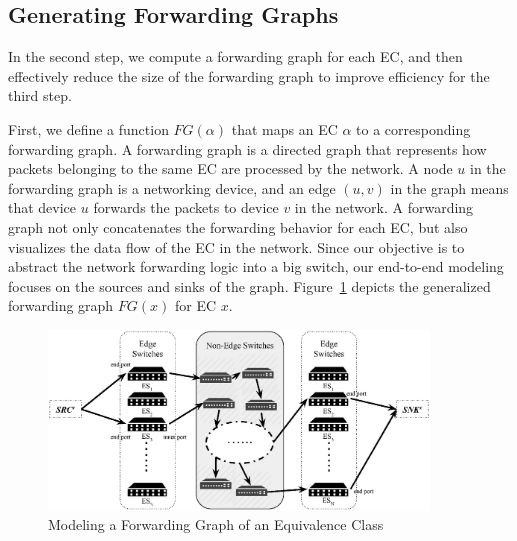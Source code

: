 \subsection{Generating Forwarding Graphs}
\label{OBS:Sec:GenerateFG}

In the second step, we compute a forwarding graph for each EC, and then effectively reduce the size of the forwarding graph to improve efficiency for the third step.

First, we define a function $FG(\alpha)$ that maps an EC $\alpha$ to a corresponding forwarding graph. A forwarding graph is a directed graph that represents how packets belonging to the same EC are processed by the network. A node $u$ in the forwarding graph is a networking device, and an edge $(u, v)$ in the graph means that device $u$ forwards the packets to device $v$ in the network.
A forwarding graph not only concatenates the forwarding behavior for each EC, but also visualizes the data flow of the EC in the network.
Since our objective is to abstract the network forwarding logic into a big switch, our end-to-end modeling focuses on the sources and sinks of the graph.
Figure~\ref{OBS:Fig:ForwardingGraphECX} depicts the generalized forwarding graph $FG(x)$ for EC $x$.


\begin{figure}
    \centering
    \includegraphics[width=0.9\textwidth]{OneBigSwitch/figures/ForwardingGraph.eps}
    \caption{Modeling a Forwarding Graph of an Equivalence Class}
    \label{OBS:Fig:ForwardingGraphECX}
\end{figure}

